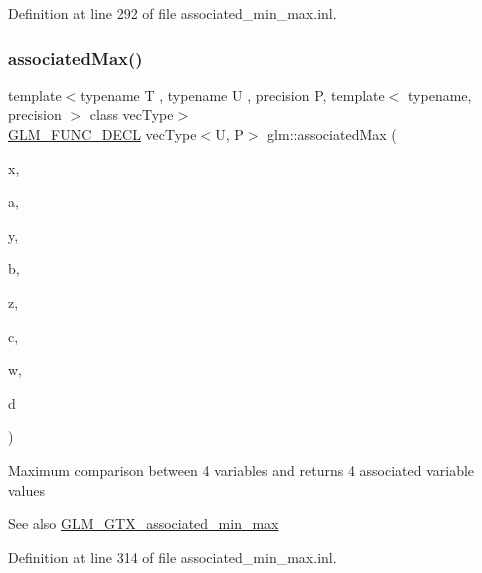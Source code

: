 Definition at line 292 of file associated\+\_\+min\+\_\+max.\+inl.

\mbox{\label{group__gtx__associated__min__max_ga7a165de1af9a3f9193516a3b47407086}} 
\subsubsection{\texorpdfstring{associatedMax()}{associatedMax()}\hspace{0.1cm}{\footnotesize\ttfamily [11/12]}}
{\footnotesize\ttfamily template$<$typename T , typename U , precision P, template$<$ typename, precision $>$ class vec\+Type$>$ \\
\mbox{\hyperlink{setup_8hpp_ab2d052de21a70539923e9bcbf6e83a51}{G\+L\+M\+\_\+\+F\+U\+N\+C\+\_\+\+D\+E\+CL}} vec\+Type$<$U, P$>$ glm\+::associated\+Max (\begin{DoxyParamCaption}\item[{T}]{x,  }\item[{vec\+Type$<$ U, P $>$ const \&}]{a,  }\item[{T}]{y,  }\item[{vec\+Type$<$ U, P $>$ const \&}]{b,  }\item[{T}]{z,  }\item[{vec\+Type$<$ U, P $>$ const \&}]{c,  }\item[{T}]{w,  }\item[{vec\+Type$<$ U, P $>$ const \&}]{d }\end{DoxyParamCaption})}

Maximum comparison between 4 variables and returns 4 associated variable values \begin{DoxySeeAlso}{See also}
\mbox{\hyperlink{group__gtx__associated__min__max}{G\+L\+M\+\_\+\+G\+T\+X\+\_\+associated\+\_\+min\+\_\+max}} 
\end{DoxySeeAlso}


Definition at line 314 of file associated\+\_\+min\+\_\+max.\+inl.

\mbox{\label{group__gtx__associated__min__max_ga3122fbe8133ea54749b10fb93e8a167e}} 
